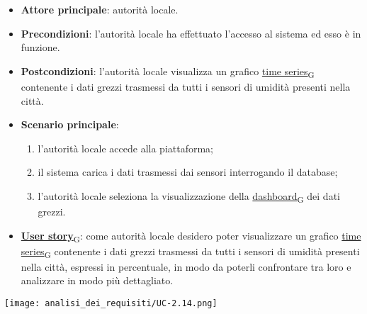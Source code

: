 \begin{itemize}
	\item \textbf{Attore principale}: autorità locale.
	\item \textbf{Precondizioni}: l'autorità locale ha effettuato l'accesso al sistema ed esso è in funzione.
	\item \textbf{Postcondizioni}: l'autorità locale visualizza un grafico \href{https://7last.github.io/docs/pb/documentazione-interna/glossario\#time-series}{time series\textsubscript{G}} contenente i dati grezzi trasmessi da tutti i sensori
	      di umidità presenti nella città.
	\item \textbf{Scenario principale}:
	      \begin{enumerate}
		      \item l'autorità locale accede alla piattaforma;
		      \item il sistema carica i dati trasmessi dai sensori interrogando il database;
		      \item l'autorità locale seleziona la visualizzazione della \href{https://7last.github.io/docs/pb/documentazione-interna/glossario\#dashboard}{dashboard\textsubscript{G}} dei dati grezzi.
	      \end{enumerate}
	\item \href{https://7last.github.io/docs/pb/documentazione-interna/glossario\#user-story}{\textbf{User story}\textsubscript{G}}:
	      come autorità locale desidero poter visualizzare un grafico \href{https://7last.github.io/docs/pb/documentazione-interna/glossario\#time-series}{time series\textsubscript{G}} contenente i dati grezzi trasmessi da tutti i sensori
	      di umidità presenti nella città, espressi in percentuale, in modo da poterli confrontare tra loro e analizzare in modo più dettagliato.
\end{itemize}
\begin{center}
	\texttt{[image: analisi\_dei\_requisiti/UC-2.14.png]}
\end{center}


